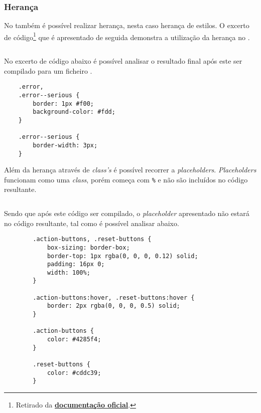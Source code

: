\subsubsection{Herança}

No \textbf{} também é possível realizar herança, nesta caso herança de estilos. O excerto de código\footnote{Retirado da \href{https://sass-lang.com/documentation/at-rules/extend}{\textbf{documentação oficial}}.} que é apresentado de seguida demonstra a utilização da herança no \textbf{}.

\begin{longlisting}
	\inputminted{sass}{code/sass/extends.sass}
	\caption{Demonstração de herança no \textbf{Sass}}
\end{longlisting}

No excerto de código abaixo é possível analisar o resultado final após este ser compilado para um ficheiro \textbf{}.

\begin{longlisting}
\begin{verbatim}
	.error,
	.error--serious {
		border: 1px #f00;
		background-color: #fdd;
	}

	.error--serious {
		border-width: 3px;
	}
\end{verbatim}
\caption{Código \textbf{CSS} resultante da compilação do excerto de código anterior}
\end{longlisting}

Além da herança através de \textit{class's} é possível recorrer a \textit{placeholders}. \textit{Placeholders} funcionam como uma \textit{class}, porém começa com \verb|%| e não são incluídos no código \textbf{} resultante.

\begin{longlisting}
	\inputminted{sass}{code/sass/placeholders.sass}
	\caption{Demonstração de \textit{placeholders} em \textbf{Sass}\footnote{Excerto de código retirado da \textbf{\href{https://sass-lang.com/documentation/style-rules/placeholder-selectors}{documentação oficial}}}}
\end{longlisting}

Sendo que após este código ser compilado, o \textit{placeholder} apresentado não estará no código \textbf{} resultante, tal como é possível analisar abaixo.

\begin{longlisting}
	\begin{verbatim}
		.action-buttons, .reset-buttons {
			box-sizing: border-box;
			border-top: 1px rgba(0, 0, 0, 0.12) solid;
			padding: 16px 0;
			width: 100%;
		}

		.action-buttons:hover, .reset-buttons:hover {
			border: 2px rgba(0, 0, 0, 0.5) solid;
		}

		.action-buttons {
			color: #4285f4;
		}

		.reset-buttons {
			color: #cddc39;
		}
	\end{verbatim}
	\caption{Código \textbf{CSS} resultante da compilação do excerto de código com \textit{placeholder}}
\end{longlisting}